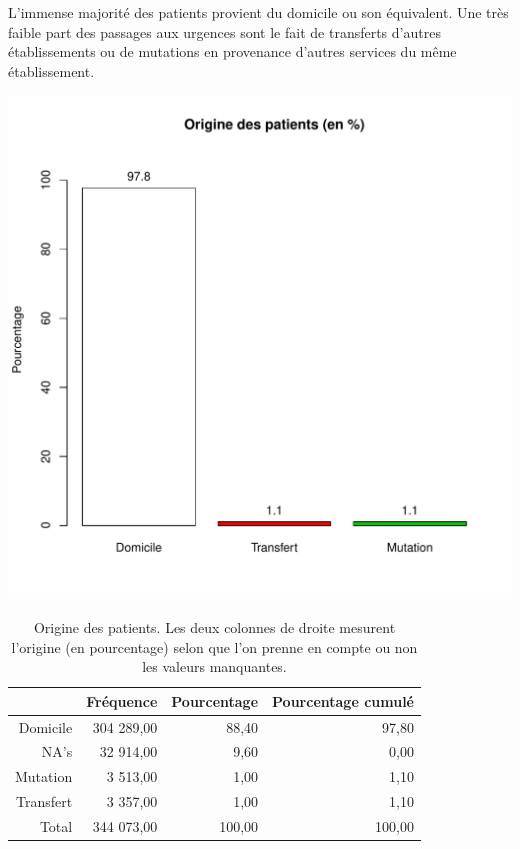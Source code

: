 \documentclass[12pt,english,french,twoside]{book}\usepackage[]{graphicx}\usepackage[]{color}
\makeatletter
\def\maxwidth{ %
  \ifdim\Gin@nat@width>\linewidth
    \linewidth
  \else
    \Gin@nat@width
  \fi
}
\makeatother
\begin{document}

L'immense majorité des patients provient du domicile ou son équivalent. Une très faible part des passages aux urgences sont le fait de transferts d'autres établissements ou de mutations en provenance d'autres services du même établissement.


\includegraphics[width=\maxwidth]{figure/mode_entree-1} 
\begin{table}[ht]
\centering
\begin{tabular}{rrrr}
  \hline
 & Fréquence & Pourcentage & Pourcentage cumulé \\ 
  \hline
Domicile & 304 289,00 & 88,40 & 97,80 \\ 
  NA's & 32 914,00 & 9,60 & 0,00 \\ 
  Mutation & 3 513,00 & 1,00 & 1,10 \\ 
  Transfert & 3 357,00 & 1,00 & 1,10 \\ 
    Total & 344 073,00 & 100,00 & 100,00 \\ 
   \hline
\end{tabular}
\caption[Origine des patients]{Origine des patients. Les deux colonnes de droite mesurent l'origine (en pourcentage) selon que l'on prenne en compte ou non les valeurs manquantes. } 
\label{origine}
\end{table}
\end{document}
